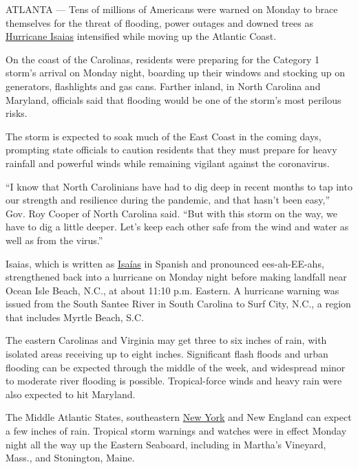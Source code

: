 ATLANTA --- Tens of millions of Americans were warned on Monday to brace
themselves for the threat of flooding, power outages and downed trees as
\href{https://www.nytimes3xbfgragh.onion/2020/08/04/us/isaias-storm-updates.html}{Hurricane
Isaias} intensified while moving up the Atlantic Coast.

On the coast of the Carolinas, residents were preparing for the Category
1 storm's arrival on Monday night, boarding up their windows and
stocking up on generators, flashlights and gas cans. Farther inland, in
North Carolina and Maryland, officials said that flooding would be one
of the storm's most perilous risks.

The storm is expected to soak much of the East Coast in the coming days,
prompting state officials to caution residents that they must prepare
for heavy rainfall and powerful winds while remaining vigilant against
the coronavirus.

``I know that North Carolinians have had to dig deep in recent months to
tap into our strength and resilience during the pandemic, and that
hasn't been easy,'' Gov. Roy Cooper of North Carolina said. ``But with
this storm on the way, we have to dig a little deeper. Let's keep each
other safe from the wind and water as well as from the virus.''

Isaias, which is written as
\href{https://www.nytimes3xbfgragh.onion/2020/08/04/nyregion/isaias-tropical-storm-nyc.html}{Isaías}
in Spanish and pronounced ees-ah-EE-ahs, strengthened back into a
hurricane on Monday night before making landfall near Ocean Isle Beach,
N.C., at about 11:10 p.m. Eastern. A hurricane warning was issued from
the South Santee River in South Carolina to Surf City, N.C., a region
that includes Myrtle Beach, S.C.

The eastern Carolinas and Virginia may get three to six inches of rain,
with isolated areas receiving up to eight inches. Significant flash
floods and urban flooding can be expected through the middle of the
week, and widespread minor to moderate river flooding is possible.
Tropical-force winds and heavy rain were also expected to hit Maryland.

The Middle Atlantic States, southeastern
\href{https://www.nytimes3xbfgragh.onion/2020/08/04/nyregion/isaias-tropical-storm-nyc.html}{New
York} and New England can expect a few inches of rain. Tropical storm
warnings and watches were in effect Monday night all the way up the
Eastern Seaboard, including in Martha's Vineyard, Mass., and Stonington,
Maine.


